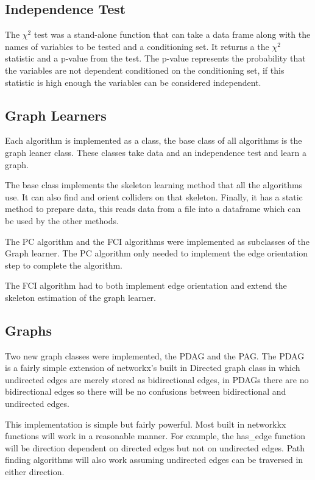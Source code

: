\documentclass{UoYCSproject}
\begin{document}
\subsection{Independence Test}
The $\chi^2$ test was a stand-alone function that can take a data frame along with the names of variables to be tested and a conditioning set. It returns a the $\chi^2$ statistic and a p-value from the test. The p-value represents the probability that the variables are not dependent conditioned on the conditioning set, if this statistic is high enough the variables can be considered independent.

\subsection{Graph Learners}
Each algorithm is implemented as a class, the base class of all algorithms is the graph leaner class. These classes take data and an independence test and learn a graph.

The base class implements the skeleton learning method that all the algorithms use. It can also find and orient colliders on that skeleton. Finally, it has a static method to prepare data, this reads data from a file into a dataframe which can be used by the other methods.

The PC algorithm and the FCI algorithms were implemented as subclasses of the Graph learner. The PC algorithm only needed to implement the edge orientation step to complete the algorithm.

The FCI algorithm had to both implement edge orientation and extend the skeleton estimation of the graph learner.


\subsection{Graphs}  
Two new graph classes were implemented, the PDAG and the PAG. The PDAG is a fairly simple extension of networkx's built in Directed graph class in which undirected edges are merely stored as bidirectional edges, in PDAGs there are no bidirectional edges so there will be no confusions between bidirectional and undirected edges.

This implementation is simple but fairly powerful. Most built in networkkx functions will work in a reasonable manner. For example, the has\_edge function will be direction dependent on directed edges but not on undirected edges. Path finding algorithms will also work assuming undirected edges can be traversed in either direction.
\end{document}
